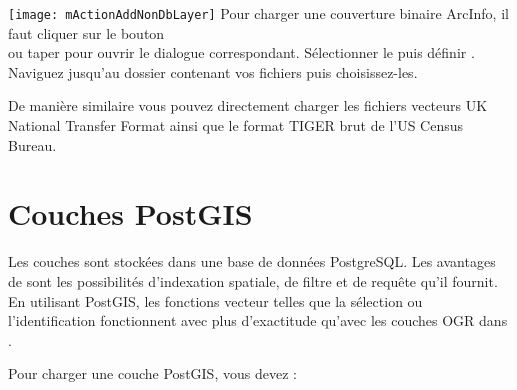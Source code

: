 
\texttt{[image: mActionAddNonDbLayer]} Pour charger une couverture binaire ArcInfo, il faut cliquer sur le bouton\\  ou taper  pour ouvrir le dialogue correspondant. Sélectionner le  puis définir . Naviguez jusqu'au dossier contenant vos fichiers puis choisissez-les.

De manière similaire vous pouvez directement charger les fichiers vecteurs UK National Transfer Format ainsi que le format TIGER brut de l'US Census Bureau.

\section{Couches PostGIS}
\label{label_postgis}

Les couches \pg sont stockées dans une base de données PostgreSQL. Les avantages de \pg sont les possibilités d'indexation spatiale, de filtre et de requête qu'il fournit. En utilisant PostGIS, les fonctions vecteur telles que la sélection ou l'identification fonctionnent avec plus d'exactitude qu'avec les couches OGR dans \qg.

Pour charger une couche PostGIS, vous devez :

